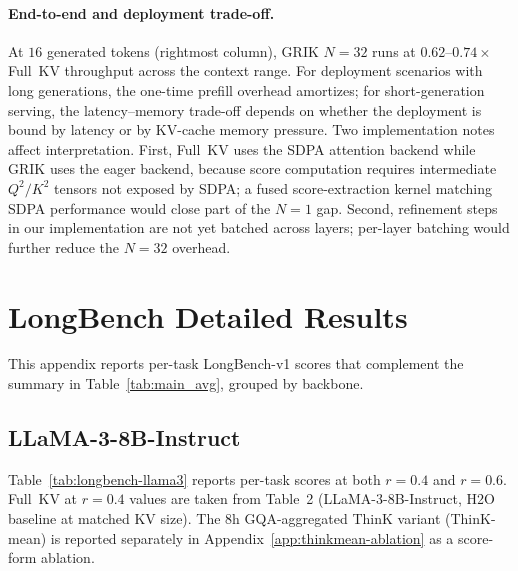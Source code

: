 \documentclass{article}
\begin{document}
\paragraph{End-to-end and deployment trade-off.} At $16$ generated tokens (rightmost column), GRIK $N{=}32$ runs at $0.62$--$0.74\times$ Full~KV throughput across the context range. For deployment scenarios with long generations, the one-time prefill overhead amortizes; for short-generation serving, the latency--memory trade-off depends on whether the deployment is bound by latency or by KV-cache memory pressure. Two implementation notes affect interpretation. First, Full~KV uses the SDPA attention backend while GRIK uses the eager backend, because score computation requires intermediate $Q^2/K^2$ tensors not exposed by SDPA; a fused score-extraction kernel matching SDPA performance would close part of the $N{=}1$ gap. Second, refinement steps in our implementation are not yet batched across layers; per-layer batching would further reduce the $N{=}32$ overhead.
 
\section{LongBench Detailed Results}
\label{app:longbench-pertask}
 
This appendix reports per-task LongBench-v1 scores that complement the summary in Table~\ref{tab:main_avg}, grouped by backbone.
 
\subsection{LLaMA-3-8B-Instruct}
 
Table~\ref{tab:longbench-llama3} reports per-task scores at both $r{=}0.4$ and $r{=}0.6$. Full~KV at $r{=}0.4$ values are taken from \citet{think} Table~2 (LLaMA-3-8B-Instruct, H2O baseline at matched KV size). The 8h GQA-aggregated ThinK variant (ThinK-mean) is reported separately in Appendix~\ref{app:thinkmean-ablation} as a score-form ablation.
 
\end{document}
